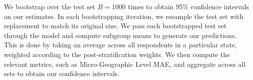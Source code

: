 We bootstrap over the test set $B=1000$ times to obtain 95\% confidence intervals on our estimates. In each bootstrapping iteration, we resample the test set with replacement to match its original size. We pass each bootstrapped test set through the model and compute subgroup means to generate our predictions. This is done by taking an average across all respondents in a particular state, weighted according to the post-stratification weights. We then compute the relevant metrics, such as Micro-Geographic Level MAE, and aggregate across all sets to obtain our confidence intervals. 

 


